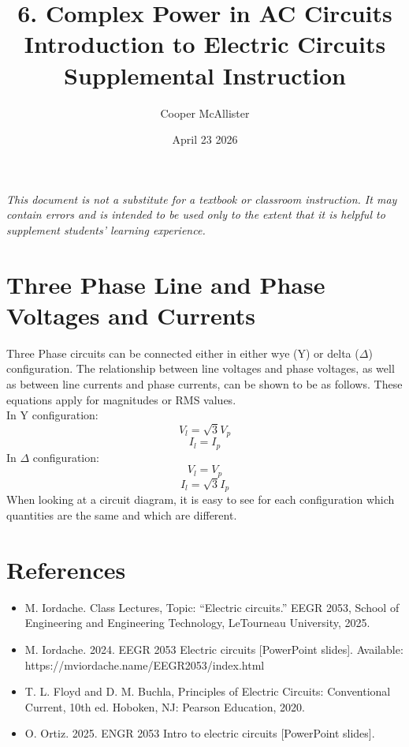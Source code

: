 \documentclass{article}
\title{6. Complex Power in AC Circuits \\  \large Introduction to Electric Circuits \\ Supplemental Instruction}
\author{Cooper McAllister}
\date{April 23 2026}
\begin{document}
 {
	\fancyhf{}
	\renewcommand{\headrulewidth}{0pt}
	\renewcommand{\footrulewidth}{0.4pt}
	\fancyfoot[R]{\thepage}
}
\pagestyle{footerstyle}
\maketitle
\thispagestyle{footerstyle}

\begin{center}
\textit{This document is not a substitute for a textbook or classroom instruction. It may contain errors and is intended to be used only to the extent that it is helpful to supplement students' learning experience.}
\end{center}

\section{Three Phase Line and Phase Voltages and Currents}
Three Phase circuits can be connected either in either wye (Y) or delta ($\Delta$) configuration. The relationship between line voltages and phase voltages, as well as between line currents and phase currents, can be shown to be as follows. These equations apply for magnitudes or RMS values.
\\In Y configuration:
$$V_l = \sqrt{3}V_p$$
$$I_l = I_p$$
In $\Delta$ configuration:
$$V_l = V_p$$
$$I_l = \sqrt{3}I_p$$
When looking at a circuit diagram, it is easy to see for each configuration which quantities are the same and which are different.


\newpage
\section*{References}
\begin{itemize}
\item M. Iordache. Class Lectures, Topic: ``Electric circuits.'' EEGR 2053, School of Engineering and Engineering Technology, LeTourneau University, 2025.
\item M. Iordache. 2024. EEGR 2053 Electric circuits [PowerPoint slides]. Available: \\ https://mviordache.name/EEGR2053/index.html
\item T. L. Floyd and D. M. Buchla, Principles of Electric Circuits: Conventional Current, 10th ed. Hoboken, NJ: Pearson Education, 2020.
\item O. Ortiz. 2025. ENGR 2053 Intro to electric circuits [PowerPoint slides].
\end{itemize}

	
\end{document}
